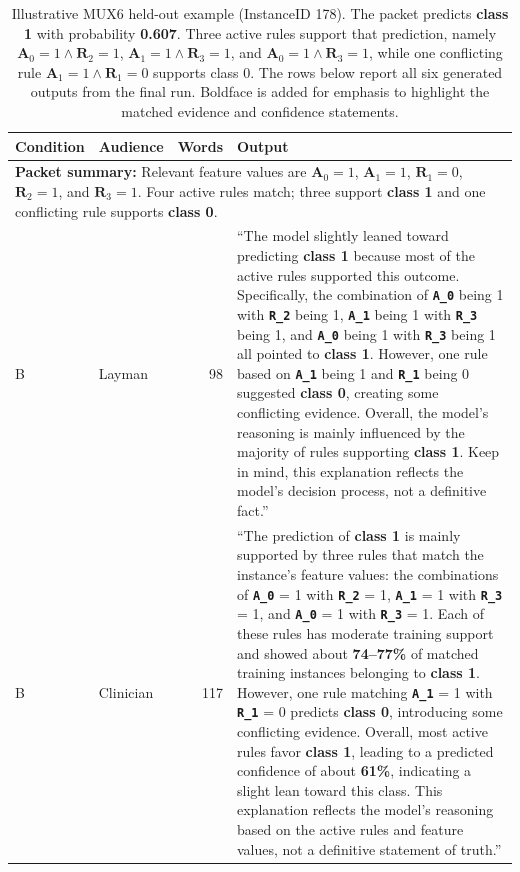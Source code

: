 \documentclass[sigconf,nonacm]{acmart}
\begin{document}
\begin{table}[t]
\caption{Illustrative MUX6 held-out example (InstanceID 178). The packet predicts \textbf{class 1} with probability \textbf{0.607}. Three active rules support that prediction, namely $\mathbf{A}_0 = 1 \wedge \mathbf{R}_2 = 1$, $\mathbf{A}_1 = 1 \wedge \mathbf{R}_3 = 1$, and $\mathbf{A}_0 = 1 \wedge \mathbf{R}_3 = 1$, while one conflicting rule $\mathbf{A}_1 = 1 \wedge \mathbf{R}_1 = 0$ supports class 0. The rows below report all six generated outputs from the final run. Boldface is added for emphasis to highlight the matched evidence and confidence statements.}
\label{tab:mux6-example}
\centering
\footnotesize
\renewcommand{\arraystretch}{1.1}
\begin{tabular}{p{1.6cm}p{1.4cm}r p{11.0cm}}
\toprule
\textbf{Condition} & \textbf{Audience} & \textbf{Words} & \textbf{Output} \\
\midrule
\multicolumn{4}{p{14.8cm}}{\textbf{Packet summary:} Relevant feature values are $\textbf{A}_0 = 1$, $\textbf{A}_1 = 1$, $\textbf{R}_1 = 0$, $\textbf{R}_2 = 1$, and $\textbf{R}_3 = 1$. Four active rules match; three support \textbf{class 1} and one conflicting rule supports \textbf{class 0}.} \\
\midrule
B & Layman & 98 & ``The model slightly leaned toward predicting \textbf{class 1} because most of the active rules supported this outcome. Specifically, the combination of \texttt{\textbf{A\_0}} being 1 with \texttt{\textbf{R\_2}} being 1, \texttt{\textbf{A\_1}} being 1 with \texttt{\textbf{R\_3}} being 1, and \texttt{\textbf{A\_0}} being 1 with \texttt{\textbf{R\_3}} being 1 all pointed to \textbf{class 1}. However, one rule based on \texttt{\textbf{A\_1}} being 1 and \texttt{\textbf{R\_1}} being 0 suggested \textbf{class 0}, creating some conflicting evidence. Overall, the model's reasoning is mainly influenced by the majority of rules supporting \textbf{class 1}. Keep in mind, this explanation reflects the model's decision process, not a definitive fact.'' \\
B & Clinician & 117 & ``The prediction of \textbf{class 1} is mainly supported by three rules that match the instance's feature values: the combinations of \texttt{\textbf{A\_0}} = 1 with \texttt{\textbf{R\_2}} = 1, \texttt{\textbf{A\_1}} = 1 with \texttt{\textbf{R\_3}} = 1, and \texttt{\textbf{A\_0}} = 1 with \texttt{\textbf{R\_3}} = 1. Each of these rules has moderate training support and showed about \textbf{74--77\%} of matched training instances belonging to \textbf{class 1}. However, one rule matching \texttt{\textbf{A\_1}} = 1 with \texttt{\textbf{R\_1}} = 0 predicts \textbf{class 0}, introducing some conflicting evidence. Overall, most active rules favor \textbf{class 1}, leading to a predicted confidence of about \textbf{61\%}, indicating a slight lean toward this class. This explanation reflects the model's reasoning based on the active rules and feature values, not a definitive statement of truth.'' \\

\end{tabular}
\end{table}
\end{document}
